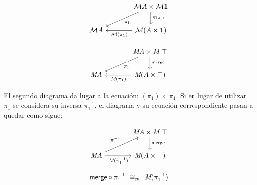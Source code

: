 \begin{multicols}{2}
\begin{equation}\label{diagrama1}
\begin{tikzcd}[column sep = large]
& \mathcal{M} A \times \mathcal{M} \mathbf{1} \arrow[d, "m_{A,\mathbf{1}}"] \arrow[dl, "\pi_1"]  \\
\mathcal{M} A & \mathcal{M} (A \times \mathbf{1}) \arrow[l, "\mathcal{M}(\pi_1)"]
\end{tikzcd}
\end{equation}

\begin{equation}\label{diagrama2}
\begin{tikzcd}[column sep = large]
& \AgdaBound{M} A \times \AgdaBound{M} \ \AgdaDatatype{$\top$} \arrow[d, "\AgdaField{merge}"] \arrow[dl, "\pi_1"]  \\
\AgdaBound{M} A & \AgdaBound{M} (A \times \AgdaDatatype{$\top$}) \arrow[l, "\AgdaBound{M}(\pi_1)"]
\end{tikzcd}
\end{equation}
\end{multicols}

El segundo diagrama da lugar a la ecuación: $(\pi_1) \ \circ$   $\pi_1$. Si en lugar de utilizar $\pi_1$ se considera su inversa $\pi_1^{-1}$, el diagrama y su ecuación correspondiente pasan a quedar como sigue:
\vspace{-1.25\baselineskip}

\begin{multicols}{2}
\begin{equation}\label{diagrama3}
\begin{tikzcd}[column sep = large]
& \AgdaBound{M} A \times \AgdaBound{M} \ \AgdaDatatype{$\top$} \arrow[d, "\AgdaField{merge}"]  \\
\AgdaBound{M} A \arrow[ur, "\pi_1^{-1}"] \arrow{r}[below]{\AgdaBound{M}(\pi_1^{-1})} & \AgdaBound{M} (A \times \AgdaDatatype{$\top$}) 
\end{tikzcd}
\end{equation}

\vspace*{\fill}
\begin{equation}
\AgdaField{merge} \circ \pi_1^{-1} \ \ \AgdaField{$\cong_m$} \ \ \AgdaBound{M} (\pi_1^{-1}) 
\end{equation}
\vspace*{\fill}
\end{multicols}

